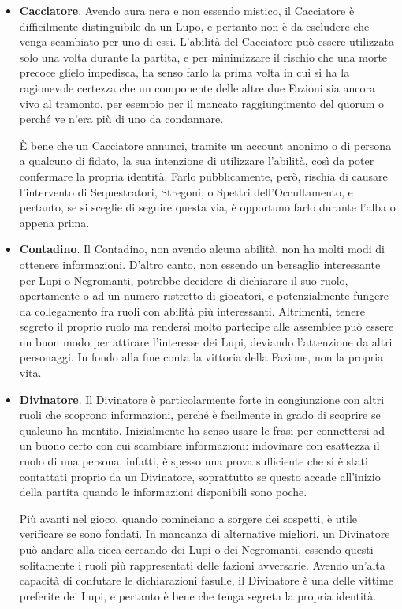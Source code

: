 \documentclass[a4paper,10pt]{article}
\begin{document}
\begin{itemize}
	
	\item {\bf Cacciatore}. Avendo aura nera e non essendo mistico, il Cacciatore è difficilmente distinguibile da un Lupo, e pertanto non è da escludere che venga scambiato per uno di essi. L'abilità del Cacciatore può essere utilizzata solo una volta durante la partita, e per minimizzare il rischio che una morte precoce glielo impedisca, ha senso farlo la prima volta in cui si ha la ragionevole certezza che un componente delle altre due Fazioni sia ancora vivo al tramonto, per esempio per il mancato raggiungimento del quorum o perché ve n'era più di uno da condannare.
	
	È bene che un Cacciatore annunci, tramite un account anonimo o di persona a qualcuno di fidato, la sua intenzione di utilizzare l'abilità, così da poter confermare la propria identità. Farlo pubblicamente, però, rischia di causare l'intervento di Sequestratori, Stregoni, o Spettri dell'Occultamento, e pertanto, se si sceglie di seguire questa via, è opportuno farlo durante l'alba o appena prima.
	
	\item {\bf Contadino}. Il Contadino, non avendo alcuna abilità, non ha molti modi di ottenere informazioni. D'altro canto, non essendo un bersaglio interessante per Lupi o Negromanti, potrebbe decidere di dichiarare il suo ruolo, apertamente o ad un numero ristretto di giocatori, e potenzialmente fungere da collegamento fra ruoli con abilità più interessanti. Altrimenti, tenere segreto il proprio ruolo ma rendersi molto partecipe alle assemblee può essere un buon modo per attirare l'interesse dei Lupi, deviando l'attenzione da altri personaggi. In fondo alla fine conta la vittoria della Fazione, non la propria vita.
	
	\item {\bf Divinatore}. Il Divinatore è particolarmente forte in congiunzione con altri ruoli che scoprono informazioni, perché è facilmente in grado di scoprire se qualcuno ha mentito. Inizialmente ha senso usare le frasi per connettersi ad un buono certo con cui scambiare informazioni: indovinare con esattezza il ruolo di una persona, infatti, è spesso una prova sufficiente che si è stati contattati proprio da un Divinatore, soprattutto se questo accade all'inizio della partita quando le informazioni disponibili sono poche.
	
	Più avanti nel gioco, quando cominciano a sorgere dei sospetti, è utile verificare se sono fondati. In mancanza di alternative migliori, un Divinatore può andare alla cieca cercando dei Lupi o dei Negromanti, essendo questi solitamente i ruoli più rappresentati delle fazioni avversarie. Avendo un'alta capacità di confutare le dichiarazioni fasulle, il Divinatore è una delle vittime preferite dei Lupi, e pertanto è bene che tenga segreta la propria identità.
	

\end{itemize}
\end{document}
